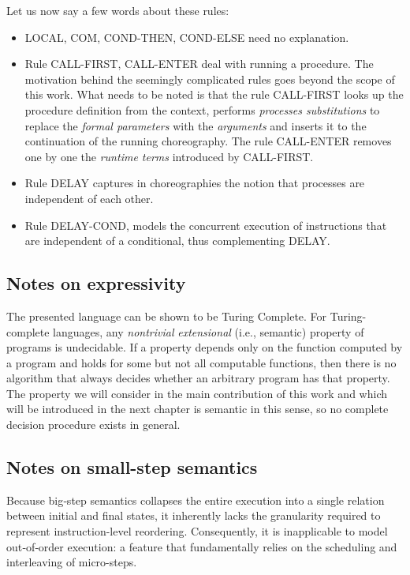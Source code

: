\documentclass[12pt,a4paper,twoside]{book}
\begin{document}
Let us now say a few words about these rules:
\begin{itemize}
\item LOCAL, COM, COND-THEN, COND-ELSE need no explanation.
\item Rule CALL-FIRST, CALL-ENTER deal with running a procedure. The motivation behind the seemingly complicated rules goes beyond the scope of this work. What needs to be noted is that the rule CALL-FIRST looks up the procedure definition from the context, performs \textit{processes substitutions} to replace the \textit{formal parameters} with the \textit{arguments} and inserts it to the continuation of the running choreography. The rule CALL-ENTER removes one by one the \textit{runtime terms} introduced by CALL-FIRST.
\item Rule DELAY captures in choreographies the notion that processes are independent of each other.
\item Rule DELAY-COND, models the concurrent execution of instructions that are independent of a conditional, thus complementing DELAY.
\end{itemize}

\subsection{Notes on expressivity}
The presented language can be shown to be Turing Complete\cite{cruz2020core}.
For Turing-complete languages, any \emph{nontrivial} \emph{extensional} (i.e., semantic) property of programs is undecidable\cite{rice1953classes}. If a property depends only on the function computed by a program and holds for some but not all computable functions, then there is no algorithm that always decides whether an arbitrary program has that property.
The property we will consider in the main contribution of this work and which will be introduced in the next chapter is semantic in this sense, so no complete decision procedure exists in general.

\subsection{Notes on small-step semantics}
Because big‑step semantics collapses the entire execution into a single relation between initial and final states, it inherently lacks the granularity required to represent instruction-level reordering. Consequently, it is inapplicable to model out‑of‑order execution: a feature that fundamentally relies on the scheduling and interleaving of micro-steps.
\end{document}
